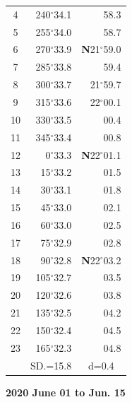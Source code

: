 \documentclass[10pt, a4paper]{report}
\begin{document}
\begin{scriptsize}
\begin{tabular*}{0.2\textwidth}[t]{@{\extracolsep{\fill}}|c|rr|}
4 & 240$^\circ$34.1 & 58.3\\
5 & 255$^\circ$34.0 & 58.7\\[2Pt]
6 & 270$^\circ$33.9 & \textbf{N}21$^\circ$59.0\\
7 & 285$^\circ$33.8 & 59.4\\
8 & 300$^\circ$33.7 & 21$^\circ$59.7\\
9 & 315$^\circ$33.6 & 22$^\circ$00.1\\
10 & 330$^\circ$33.5 & 00.4\\
11 & 345$^\circ$33.4 & 00.8\\[2Pt]
12 & 0$^\circ$33.3 & \textbf{N}22$^\circ$01.1\\
13 & 15$^\circ$33.2 & 01.5\\
14 & 30$^\circ$33.1 & 01.8\\
15 & 45$^\circ$33.0 & \raisebox{0.24ex}{\boldmath$\cdot$~\boldmath$\cdot$~~}02.1\\
16 & 60$^\circ$33.0 & 02.5\\
17 & 75$^\circ$32.9 & 02.8\\[2Pt]
18 & 90$^\circ$32.8 & \textbf{N}22$^\circ$03.2\\
19 & 105$^\circ$32.7 & 03.5\\
20 & 120$^\circ$32.6 & 03.8\\
21 & 135$^\circ$32.5 & \raisebox{0.24ex}{\boldmath$\cdot$~\boldmath$\cdot$~~}04.2\\
22 & 150$^\circ$32.4 & 04.5\\
23 & 165$^\circ$32.3 & 04.8\\
\hline
\rule{0pt}{2.4ex} & \multicolumn{1}{c}{SD.=15.8} & \multicolumn{1}{c|}{d=0.4}\\
\hline
\end{tabular*}

\end{scriptsize}
\newpage
\sffamily
\noindent
\begin{flushright}
\textbf{2020 June 01 to Jun. 15}\par
\end{flushright}
\end{document}
